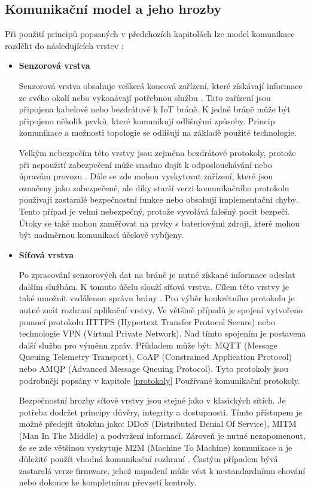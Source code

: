  \subsection{Komunikační model a jeho hrozby}
 Při použití principů popsaných v předchozích kapitolách lze model komunikace rozdělit
 do následujících vrstev \cite{iotSurvey}:
 \begin{itemize}

 \item \textbf{Senzorová vrstva}
 
 Senzorová vrstva obsahuje veškerá koncová zařízení, které získávají informace ze svého
 okolí nebo vykonávají potřebnou službu \cite{secFramework}. Tato zařízení jsou připojena
 kabelově nebo bezdrátově k IoT bráně. K jedné bráně může být připojeno několik
 prvků, které komunikují odlišnými způsoby. Princip komunikace a možnosti topologie se odlišují
 na základě použité technologie.
 
 Velkým nebezpečím této vrstvy jsou zejména bezdrátové protokoly, protože při nepoužití
 zabezpečení může snadno dojít k odposlouchávání nebo úpravám provozu \cite{iotSurvey}.
 Dále se zde mohou vyskytovat zařízení, které jsou označeny jako zabezpečené, 
 ale díky starší verzi komunikačního protokolu používají zastaralé bezpečnostní funkce
 nebo obsahují implementační chyby. 
 Tento případ je velmi nebezpečný, protože vyvolává falešný pocit bezpečí. Útoky se také mohou 
 zaměřovat na prvky s bateriovými zdroji, které mohou být nadměrnou komunikací
 účelově vybíjeny.
 
 \item \textbf{Síťová vrstva}
 
  Po zpracování senzorových dat na bráně je nutné získané informace odeslat dalším
 službám. K tomuto účelu slouží síťová vrstva. Cílem této vrstvy je také umožnit 
 vzdálenou správu brány \cite{secFramework}. Pro výběr konkrétního protokolu je 
 nutné znát rozhraní aplikační vrstvy. Ve většině případů je  spojení vytvořeno
 pomocí protokolu HTTPS (Hypertext Transfer Protocol Secure) nebo technologie
 VPN (Virtual Private Network). Nad tímto spojením je postavena další služba pro 
 výměnu zpráv. Příkladem může být: MQTT (Message Queuing Telemetry Transport),
 CoAP (Constrained Application Protocol) nebo
 AMQP (Advanced Message Queuing Protocol). Tyto protokoly jsou podrobněji popsány v 
 kapitole \ref{protokoly} Používané komunikační protokoly.
 
 Bezpečnostní hrozby síťové vrstvy jsou stejné jako v klasických sítích. Je potřeba
 dodržet principy důvěry, integrity a dostupnosti. Tímto přístupem je možné
 předejít útokům jako: DDoS (Distributed Denial Of Service),
 MITM (Man In The Middle) a podvržení informací. Zároveň je nutné
 nezapomenout, že se zde většinou vyskytuje M2M (Machine To Machine)
 komunikace a je důležité použít 
 vhodná komunikační rozhraní \cite{iotSurvey}. Častým případem bývá zastaralá 
 verze firmware, jehož napadení může vést k nestandardnímu chování nebo dokonce 
 ke kompletnímu převzetí kontroly. 
 

\end{itemize}
